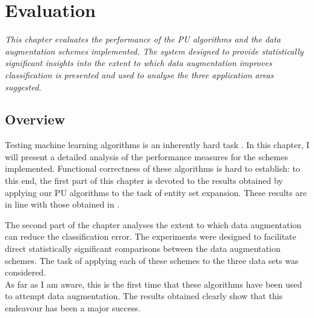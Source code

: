 \documentclass[12pt,twoside,notitlepage,amsart]{report} %
\begin{document}
	\cleardoublepage 
	
	\chapter{Evaluation} %
	

\emph{This chapter evaluates the performance of the PU algorithms and the data augmentation schemes implemented. The system designed to provide statistically significant insights into the extent to which data augmentation improves classification is presented and used to analyse the three application areas suggested. } 

	\section{Overview}
		
	Testing machine learning algorithms is an inherently hard task \cite{Bishop06}. In this chapter, I will present a detailed analysis of the performance measures for the schemes implemented. Functional correctness of these algorithms is hard to establish: to this end, the first part of this chapter is devoted to the results obtained by applying our PU algorithms to the task of entity set expansion. These results are in line with those obtained in \cite{Li03, Li10, Liu02}. 
	
	The second part of the chapter analyses the extent to which data augmentation can reduce the classification error. The experiments were designed to facilitate direct statistically significant comparisons between the data augmentation schemes. The task of applying each of these schemes to the three data sets was considered. \\
	
	As far as I am aware, this is the first time that these algorithms have been used to attempt data augmentation. The results obtained clearly show that this endeavour has been a major success. 
	 
	
\end{document}

